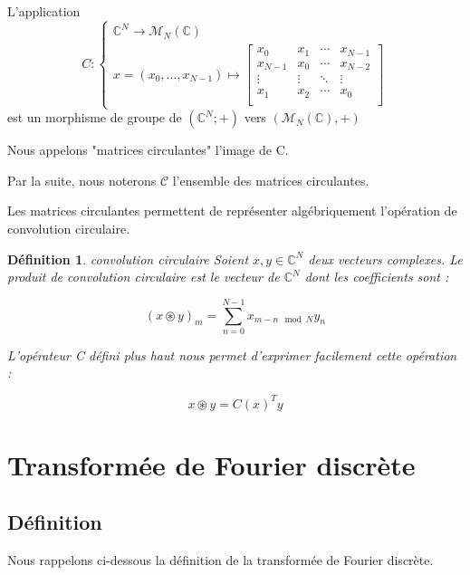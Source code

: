\documentclass[11pt,oneside]{article}
\newtheorem{definition}[theorem]{Définition}
\begin{document}
\begin{tcolorbox}[colback=yellow!10!white,colframe=black!75!black,title=Definition: matrices circulantes]
     L'application 
$$C : \begin{cases}
\mathbb{C}^N \to \mathcal{M}_N(\mathbb{C})  \\
x = (x_0, \ldots, x_{N-1}) \mapsto 
\begin{bmatrix} 
x_0 & x_1 & \cdots & x_{N-1} \\ 
x_{N-1} & x_0 & \cdots & x_{N-2} \\ 
\vdots & \vdots & \ddots & \vdots \\ 
x_1 & x_2 & \cdots & x_0 \\ 
\end{bmatrix}
\end{cases}$$ est un morphisme de groupe de $(\mathbb{C}^N ; +)$ vers $(\mathcal{M}_N(\mathbb{C}), +)$

Nous appelons "matrices circulantes" l'image de C.


\end{tcolorbox}

Par la suite, nous noterons $\mathcal{C}$ l'ensemble des matrices circulantes.

Les matrices circulantes permettent de représenter algébriquement l'opération de convolution circulaire.

\begin{definition}{convolution circulaire}
    Soient $x,y \in \mathbb{C}^N$ deux vecteurs complexes.
    Le produit de convolution circulaire est le vecteur de $\mathbb{C}^N$ dont les coefficients sont :

    $$(x \circledast y)_m = \sum_{n=0}^{N-1} x_{m-n \mod N} y_{n} $$

    L'opérateur C défini plus haut nous permet d'exprimer facilement cette opération :

    $$x \circledast y = C(x)^T y$$
\end{definition}


\section{Transformée de Fourier discrète}

\subsection{Définition}

Nous rappelons ci-dessous la définition de la transformée de Fourier discrète.
\end{document}
